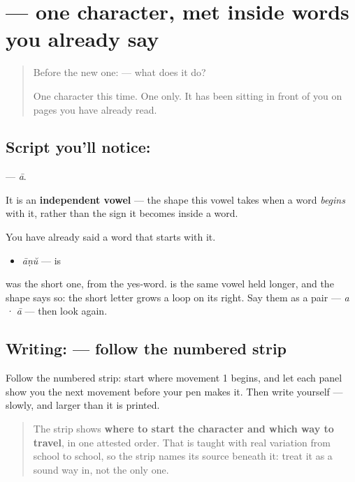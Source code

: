 \section[\texorpdfstring{\ml{ആ} (ā)}{ആ (ā)}]{ — one character, met inside words you already say}

\label{lesson:ML-S137-letter-aa}



\begin{quote}
Before the new one:  — what does it do?

One character this time. One only. It has been sitting in front of you on pages you have already read.
\end{quote}

\subsection*{Script you'll notice: }
\textbf{} — \emph{ā}.

It is an \textbf{independent vowel} — the shape this vowel takes when a word \emph{begins} with it, rather than the sign it becomes inside a word.

You have already said a word that starts with it.

\begin{itemize}
\raggedright
  \item \textbf{} \emph{āṇŭ} — is
\end{itemize}

\textbf{} was the short one, from the yes-word. \textbf{} is the same vowel held longer, and the shape says so: the short letter grows a loop on its right. Say them as a pair — \emph{a · ā} — then look again.

\subsection*{Writing:  — follow the numbered strip}

Follow the numbered strip: start where movement 1 begins, and let each panel show you the next movement before your pen makes it. Then write  yourself — slowly, and larger than it is printed.

\begin{quote}
The strip shows \textbf{where to start the character and which way to travel}, in one attested order. That is taught with real variation from school to school, so the strip names its source beneath it: treat it as a sound way in, not the only one.
\end{quote}

